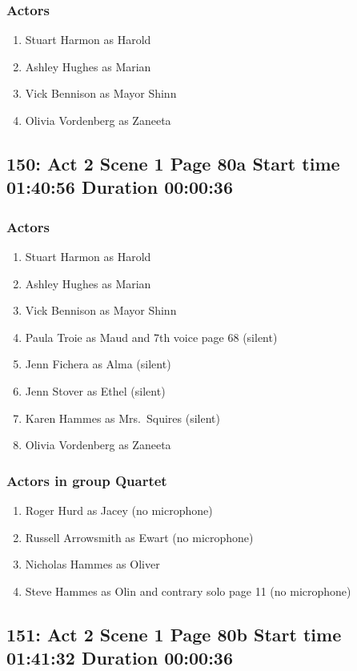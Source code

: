 \subsubsection{Actors}
\begin{enumerate}
\item Stuart Harmon as Harold
\item Ashley Hughes as Marian
\item Vick Bennison as Mayor Shinn
\item Olivia Vordenberg as Zaneeta
\end{enumerate}


\subsection{150: Act 2 Scene 1 Page 80a Start time 01:40:56 Duration 00:00:36}

\subsubsection{Actors}
\begin{enumerate}
\item Stuart Harmon as Harold
\item Ashley Hughes as Marian
\item Vick Bennison as Mayor Shinn
\item Paula Troie as Maud and 7th voice page 68 (silent)
\item Jenn Fichera as Alma (silent)
\item Jenn Stover as Ethel (silent)
\item Karen Hammes as Mrs.~Squires (silent)
\item Olivia Vordenberg as Zaneeta
\end{enumerate}
\subsubsection{Actors in group Quartet}
\begin{enumerate}
\item Roger Hurd as Jacey (no microphone)
\item Russell Arrowsmith as Ewart (no microphone)
\item Nicholas Hammes as Oliver
\item Steve Hammes as Olin and contrary solo page 11 (no microphone)
\end{enumerate}


\subsection{151: Act 2 Scene 1 Page 80b Start time 01:41:32 Duration 00:00:36}

